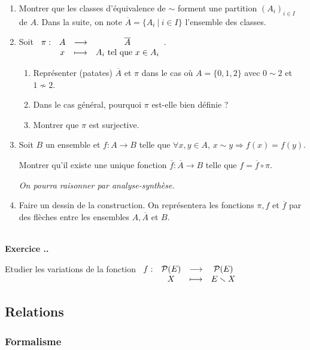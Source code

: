 \documentclass{article}
\newcommand{\fonction}[5]{\raisebox{-0.5\baselineskip}{$\begin{array}{lccc}
    #1: & #2 & \longrightarrow & #3 \\
        & #4 & \longmapsto & #5 \end{array}$}}
\newcommand{\mc}[1]{\mathcal{#1}}
\newcounter{exo}
\newcommand{\exercice}[1][\null]{\textbf{\\ Exercice \thesection.\theexo. #1} \addtocounter{exo}{1}}
\begin{document}
\begin{enumerate}

\item Montrer que les classes d'équivalence de $\sim$ forment une partition $(A_i)_{i \in I}$ de $A$. Dans la suite, on note $\overline{A} = \{A_i~|~i \in I\}$ l'ensemble des classes.

\item Soit $\fonction{\pi}{A}{\overline{A}}{x}{A_i \text{ tel que } x \in A_i}$.

\begin{enumerate}

\item Représenter (patates) $\overline{A}$ et $\pi$ dans le cas où $A = \{0,1,2\}$ avec $0 \sim 2$ et $1 \not \sim 2$.

\item Dans le cas général, pourquoi $\pi$ est-elle bien définie ?

\item Montrer que $\pi$ est surjective.

\end{enumerate}

\item Soit $B$ un ensemble et $f : A\rightarrow B$ telle que $\forall x,y \in A$, $x \sim y \Rightarrow f(x) = f(y)$.

Montrer qu'il existe une unique fonction $\overline{f} : \overline{A} \rightarrow B$ telle que $f = \overline{f} \circ \pi$.

\emph{On pourra raisonner par analyse-synthèse.}

\item Faire un dessin de la construction. On représentera les fonctions $\pi, f$ et $ \overline{f}$ par des flèches entre les ensembles $A, \overline{A}$ et $B$.
\end{enumerate}



\exercice

Etudier les variations de la fonction $\fonction{f}{\mc{P}(E)}{\mc{P}(E)}{X}{E \smallsetminus X}$






\subsection{Relations}

\subsubsection{Formalisme}
\end{document}
